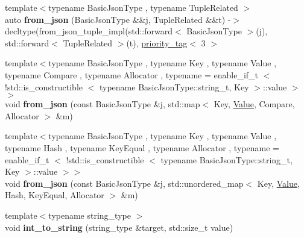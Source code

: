 \begin{DoxyCompactItemize}
\item 
\mbox{\label{namespacenlohmann_1_1detail_adcd0ecdb8495be20b0434ed0ed65826a}} 
{\footnotesize template$<$typename Basic\+Json\+Type , typename Tuple\+Related $>$ }\\auto {\bfseries from\+\_\+json} (Basic\+Json\+Type \&\&j, Tuple\+Related \&\&t) -\/$>$ decltype(from\+\_\+json\+\_\+tuple\+\_\+impl(std\+::forward$<$ Basic\+Json\+Type $>$(j), std\+::forward$<$ Tuple\+Related $>$(t), \hyperlink{structnlohmann_1_1detail_1_1priority__tag}{priority\+\_\+tag}$<$ 3 $>$
\item 
\mbox{\label{namespacenlohmann_1_1detail_ae93147a54d2740228ef16a5e6210ca3e}} 
{\footnotesize template$<$typename Basic\+Json\+Type , typename Key , typename Value , typename Compare , typename Allocator , typename  = enable\+\_\+if\+\_\+t $<$ !std\+::is\+\_\+constructible $<$                                        typename Basic\+Json\+Type\+::string\+\_\+t, Key $>$\+::value $>$$>$ }\\void {\bfseries from\+\_\+json} (const Basic\+Json\+Type \&j, std\+::map$<$ Key, \hyperlink{classValue}{Value}, Compare, Allocator $>$ \&m)
\item 
\mbox{\label{namespacenlohmann_1_1detail_aef5c8ea108f4d2b03fb4a635617510de}} 
{\footnotesize template$<$typename Basic\+Json\+Type , typename Key , typename Value , typename Hash , typename Key\+Equal , typename Allocator , typename  = enable\+\_\+if\+\_\+t $<$ !std\+::is\+\_\+constructible $<$                                        typename Basic\+Json\+Type\+::string\+\_\+t, Key $>$\+::value $>$$>$ }\\void {\bfseries from\+\_\+json} (const Basic\+Json\+Type \&j, std\+::unordered\+\_\+map$<$ Key, \hyperlink{classValue}{Value}, Hash, Key\+Equal, Allocator $>$ \&m)
\item 
\mbox{\label{namespacenlohmann_1_1detail_a3c45286b0a2f15ea0a756cb87a76cf9b}} 
{\footnotesize template$<$typename string\+\_\+type $>$ }\\void {\bfseries int\+\_\+to\+\_\+string} (string\+\_\+type \&target, std\+::size\+\_\+t value)
\item 
\mbox{\label{namespacenlohmann_1_1detail_acc422c11342b31368f610b6f96fcedc6}} 

\end{DoxyCompactItemize}
